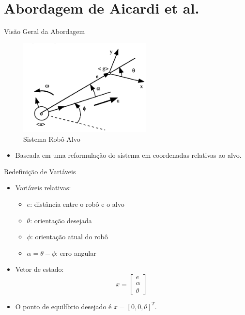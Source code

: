 \documentclass{beamer}
\begin{document}
\section{Abordagem de Aicardi et al.}

\begin{frame}{Visão Geral da Abordagem}
\begin{figure}[h!]
    \centering
    \includegraphics[width=0.6\textwidth]{Figuras/Sistema_Robo_Alvo.png}
    \caption{Sistema Robô-Alvo}
    \label{fig:Sistema_Robo_Alvo}
\end{figure}
  \begin{itemize}
    \item Baseada em uma reformulação do sistema em coordenadas relativas ao alvo.
  \end{itemize}
\end{frame}

\begin{frame}{Redefinição de Variáveis}
  \begin{itemize}
    \item Variáveis relativas:
    \begin{itemize}
      \item $e$: distância entre o robô e o alvo
      \item $\theta$: orientação desejada
      \item $\phi$: orientação atual do robô
      \item $\alpha = \theta - \phi$: erro angular
    \end{itemize}
    \item Vetor de estado:
    \[
    x = \begin{bmatrix} e \\ \alpha \\ \theta \end{bmatrix}
    \]
    \item O ponto de equilíbrio desejado é $x = [0, 0, \theta]^T$.
  \end{itemize}
\end{frame}
\end{document}
